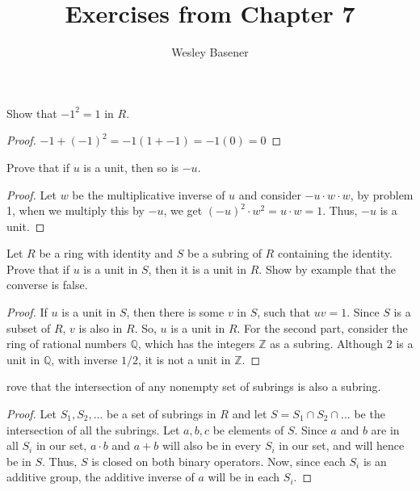 \documentclass[10pt]{article}
\newenvironment{problem}[2][Problem]{\begin{trivlist}
		\item[\hskip \labelsep {\bfseries #1}\hskip \labelsep {\bfseries #2.}]}{\end{trivlist}}
\begin{document}
	
	\title{Exercises from Chapter 7}
	\author{Wesley Basener}
	\maketitle
	
	\begin{problem}{1.1}
		Show that $-1^{2}=1$ in $R$.
		\begin{proof}
			$-1 + (-1)^{2} = -1(1 + -1) = -1(0) = 0$
		\end{proof}
	\end{problem}
	
	\begin{problem}{1.2}
		Prove that if $u$ is a unit, then so is $-u$.
		\begin{proof}
			Let $w$ be the multiplicative inverse of $u$ and consider $-u \cdot w \cdot w$, by problem 1, when we multiply this by $-u$, we get $(-u)^{2} \cdot w^{2} = u \cdot w = 1$. Thus, $-u$ is a unit.
		\end{proof}
	\end{problem}	
	
	\begin{problem}{1.3}
		Let $R$ be a ring with identity and $S$ be a subring of $R$ containing the identity. Prove that if $u$ is a unit in $S$, then it is a unit in $R$. Show by example that the converse is false. 
		\begin{proof}
			If $u$ is a unit in $S$, then there is some $v$ in $S$, such that $uv=1$. Since $S$ is a subset of $R$, $v$ is also in $R$. So, $u$ is a unit in $R$. For the second part, consider the ring of rational numbers $\mathbb{Q}$, which has the integers $\mathbb{Z}$ as a subring. Although $2$ is a unit in $\mathbb{Q}$, with inverse $1/2$, it is not a unit in $\mathbb{Z}$.
		\end{proof}
	\end{problem}
	
	\begin{problem}
		Prove that the intersection of any nonempty set of subrings is also a subring.
		\begin{proof}
			Let $S_1, S_2, ...$ be a set of subrings in $R$ and let $S= S_1 \cap S_2 \cap ...$ be the intersection of all the subrings. Let $a,b,c$ be elements of $S$. Since $a$ and $b$ are in all $S_i$ in our set, $a \cdot b$ and $a+b$ will also be in every $S_i$ in our set, and will hence be in $S$. Thus, $S$ is closed on both binary operators. Now, since each $S_i$ is an additive group, the additive inverse of $a$ will be in each $S_i$.
		\end{proof}
	\end{problem}
	
\end{document}
